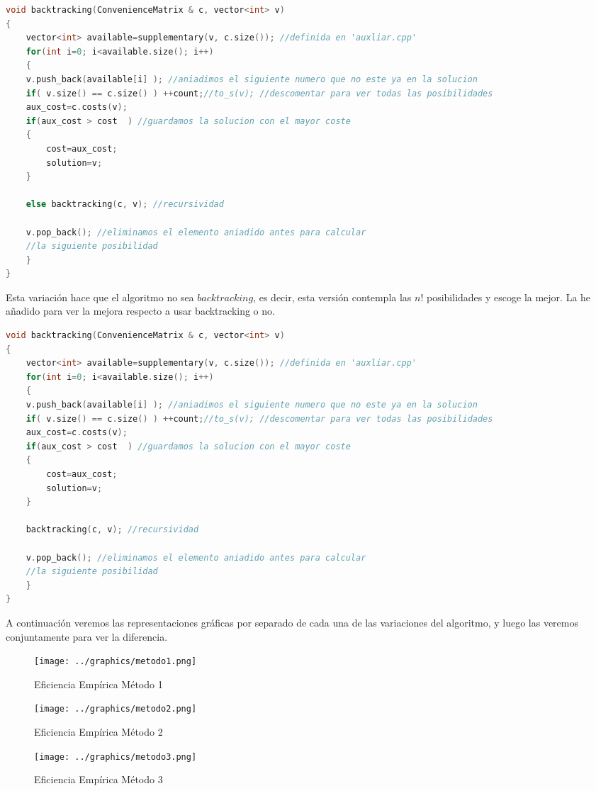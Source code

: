 \documentclass[11pt]{article}
\begin{document}
\begin{lstlisting}[language=C++, caption=Variación 1]
void backtracking(ConvenienceMatrix & c, vector<int> v)
{
	vector<int> available=supplementary(v, c.size()); //definida en 'auxliar.cpp'
	for(int i=0; i<available.size(); i++)
	{
	v.push_back(available[i] ); //aniadimos el siguiente numero que no este ya en la solucion
	if( v.size() == c.size() ) ++count;//to_s(v); //descomentar para ver todas las posibilidades
	aux_cost=c.costs(v);
	if(aux_cost > cost  ) //guardamos la solucion con el mayor coste
	{
		cost=aux_cost;
		solution=v;
	}
	
	else backtracking(c, v); //recursividad
	
	v.pop_back(); //eliminamos el elemento aniadido antes para calcular
	//la siguiente posibilidad
	}
}
\end{lstlisting}

Esta variación hace que el algoritmo no sea $backtracking$, es decir, esta versión contempla las $n!$ posibilidades y escoge la mejor. La he añadido para ver la mejora respecto a usar backtracking o no.

\begin{lstlisting}[language=C++, caption=Variación 2]
void backtracking(ConvenienceMatrix & c, vector<int> v)
{
	vector<int> available=supplementary(v, c.size()); //definida en 'auxliar.cpp'
	for(int i=0; i<available.size(); i++)
	{
	v.push_back(available[i] ); //aniadimos el siguiente numero que no este ya en la solucion
	if( v.size() == c.size() ) ++count;//to_s(v); //descomentar para ver todas las posibilidades
	aux_cost=c.costs(v);
	if(aux_cost > cost  ) //guardamos la solucion con el mayor coste
	{
		cost=aux_cost;
		solution=v;
	}
	
	backtracking(c, v); //recursividad
	
	v.pop_back(); //eliminamos el elemento aniadido antes para calcular
	//la siguiente posibilidad
	}
}

\end{lstlisting}

A continuación veremos las representaciones gráficas por separado de cada una de las variaciones del algoritmo, y luego las veremos conjuntamente para ver la diferencia.

\begin{figure}[h]
	\centering
	\texttt{[image: ../graphics/metodo1.png]}
	\caption{Eficiencia Empírica Método 1}
	\texttt{[image: ../graphics/metodo2.png]}
	\caption{Eficiencia Empírica Método 2}
	\texttt{[image: ../graphics/metodo3.png]}
	\caption{Eficiencia Empírica Método 3}
\end{figure}
\end{document}
